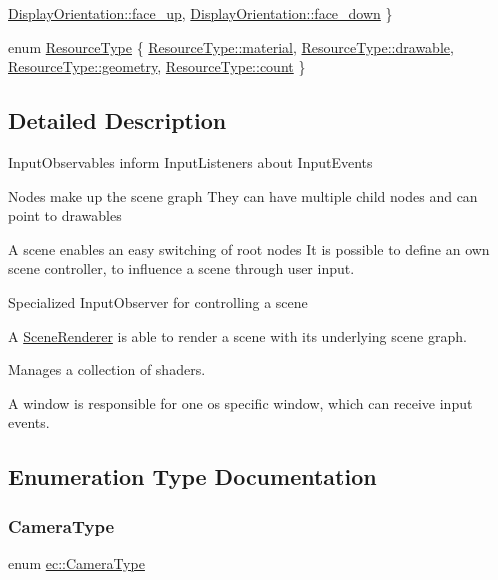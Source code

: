 \begin{DoxyCompactItemize}
\newline
\mbox{\hyperlink{namespaceec_a1492d2e603a780e281848af6a4bad719a44eab28cf52a20d532ede6171589aab4}{Display\+Orientation\+::face\+\_\+up}}, 
\mbox{\hyperlink{namespaceec_a1492d2e603a780e281848af6a4bad719ab6e43090c35d607589e26c65aa3423a0}{Display\+Orientation\+::face\+\_\+down}}
 \}
\item 
enum \mbox{\hyperlink{namespaceec_ae4420ccd0f79418a5ce075e43909289f}{Resource\+Type}} \{ \mbox{\hyperlink{namespaceec_ae4420ccd0f79418a5ce075e43909289faeec34d804c9ce6c89cff596be555e6a4}{Resource\+Type\+::material}}, 
\mbox{\hyperlink{namespaceec_ae4420ccd0f79418a5ce075e43909289fac571a3227368b17e0ecc38a2a417e201}{Resource\+Type\+::drawable}}, 
\mbox{\hyperlink{namespaceec_ae4420ccd0f79418a5ce075e43909289faed7daeb157cd9b31e53896ad3c771a26}{Resource\+Type\+::geometry}}, 
\mbox{\hyperlink{namespaceec_ae4420ccd0f79418a5ce075e43909289fae2942a04780e223b215eb8b663cf5353}{Resource\+Type\+::count}}
 \}
\end{DoxyCompactItemize}


\subsection{Detailed Description}
Input\+Observables inform Input\+Listeners about Input\+Events

Nodes make up the scene graph They can have multiple child nodes and can point to drawables

A scene enables an easy switching of root nodes It is possible to define an own scene controller, to influence a scene through user input.

Specialized Input\+Observer for controlling a scene

A \mbox{\hyperlink{classec_1_1_scene_renderer}{Scene\+Renderer}} is able to render a scene with its underlying scene graph.

Manages a collection of shaders.

A window is responsible for one os specific window, which can receive input events. 

\subsection{Enumeration Type Documentation}
\mbox{\label{namespaceec_aeb1f95f6e5d6c17c5a67f68e44746ac4}} 
\subsubsection{\texorpdfstring{Camera\+Type}{CameraType}}
{\footnotesize\ttfamily enum \mbox{\hyperlink{namespaceec_aeb1f95f6e5d6c17c5a67f68e44746ac4}{ec\+::\+Camera\+Type}}\hspace{0.3cm}{\ttfamily [strong]}}

